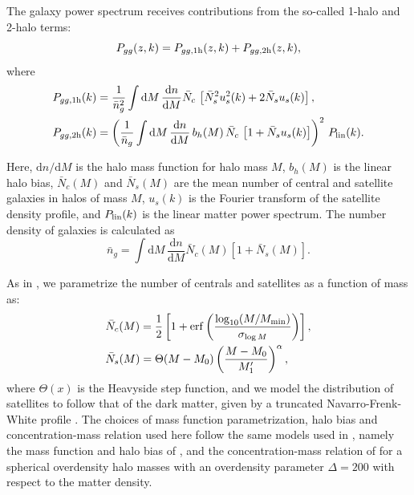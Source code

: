 \documentclass[a4paper,11pt]{article}
\begin{document}
      The galaxy power spectrum receives contributions from the so-called 1-halo and 2-halo terms:
      \begin{equation}
        P_{gg}(z,k) = P_{gg,{\rm 1h}}(z,k) + P_{gg,{\rm 2h}}(z,k),
      \end{equation}
      where
      \begin{align}
        & P_{gg,{\rm 1h}}(k)=\frac{1}{\bar{n}_g^2} \int \mathrm{d}M\,\frac{\mathrm{d}n}{\mathrm{d}M} \bar{N}_c\,\left[\bar{N}_s^2u_s^2(k)+2\bar{N}_su_s(k)\right],\\
        & P_{gg,{\rm 2h}}(k)=\left(\frac{1}{\bar{n}_g} \int \mathrm{d}M\,\frac{\mathrm{d}n}{\mathrm{d}M}\,b_h(M)\,\bar{N}_c\,\left[1+\bar{N}_su_s(k)\right]\right)^2\,P_{\rm lin}(k).
      \end{align}
    
      Here, $\mathrm{d}n/\mathrm{d}M$ is the halo mass function for halo mass $M$, $b_h(M)$ is the linear halo bias, $\bar{N}_c(M)$ and $\bar{N}_s(M)$ are the mean number of central and satellite galaxies in halos of mass $M$, $u_s(k)$ is the Fourier transform of the satellite density profile, and $P_{\rm lin}(k)$ is the linear matter power spectrum. The number density of galaxies is calculated as 
      \begin{equation}
        \bar{n}_g=\int \mathrm{d}M\,\frac{\mathrm{d}n}{\mathrm{d}M}\bar{N}_c(M)\left[1+\bar{N}_s(M)\right].
        \label{eq:ng_hod}
      \end{equation}    
    
      As in \cite{1912.08209}, we parametrize the number of centrals and satellites as a function of mass as:
      \begin{align}
        &\bar{N}_c(M)=\frac{1}{2}\left[1+{\rm erf}\left(\frac{\log_{10}(M/M_{\rm min})}{\sigma_{\log M}}\right)\right],\\
        &\bar{N}_s(M)=\Theta(M-M_0)\left(\frac{M-M_0}{M_1'}\right)^\alpha,
      \end{align}
      where $\Theta(x)$ is the Heavyside step function, and we model the distribution of satellites to follow that of the dark matter, given by a truncated Navarro-Frenk-White profile \cite{Navarro:1996}. The choices of mass function parametrization, halo bias and concentration-mass relation used here follow the same models used in \cite{1912.08209}, namely the mass function and halo bias of \cite{Tinker:2010}, and the concentration-mass relation of \cite{Duffy:2008} for a spherical overdensity halo masses with an overdensity parameter $\Delta=200$ with respect to the matter density.
 
\end{document}
